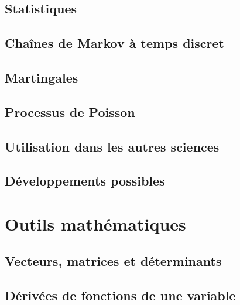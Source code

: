 \chapter{Statistiques}


\chapter{Chaînes de Markov à temps discret}


\chapter{Martingales}


\chapter{Processus de Poisson}


\chapter{Utilisation dans les autres sciences}


\chapter{Développements possibles}


\part{Outils mathématiques}         %

\chapter{Vecteurs, matrices et déterminants}

\chapter{Dérivées de fonctions de une variable}


